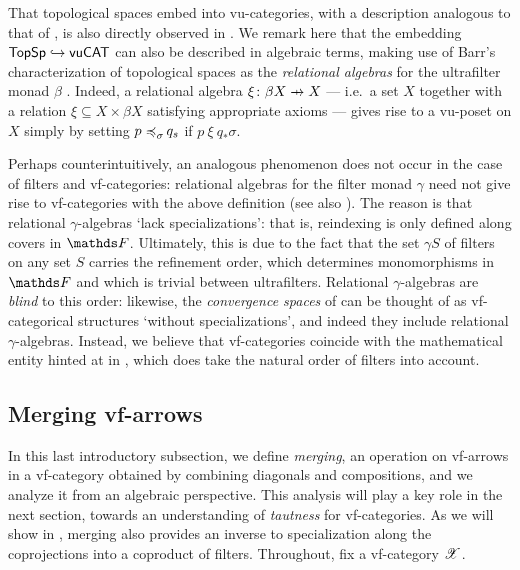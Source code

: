 \begin{rmk}\label{rmk:relational-algebras}
    That topological spaces embed into vu-categories, with a description analogous to that of , is also directly observed in \cite{saadiaExtendingConceptualCompleteness2026, hamadGeneralisedUltracategoriesConceptual2025, vangoolToposesEnoughPoints2026}. We remark here that the embedding $\mathsf{TopSp} \hookrightarrow \mathsf{vuCAT}$ can also be described in algebraic terms, making use of Barr's characterization of topological spaces as the \emph{relational algebras} for the ultrafilter monad $\beta$ \cite{barrRelationalAlgebras1970}. Indeed, a relational algebra $\xi \colon \beta X \pro X $ --- i.e.\ a set $X$ together with a relation $\xi \subseteq X \times \beta X $ satisfying appropriate axioms --- gives rise to a vu-poset on $X$ simply by setting $p \mathrel{\preccurlyeq_{{\sigma}}^{{}}\mkern-2mu} q_s$ if $p \ \xi\ q_* \sigma$.

    Perhaps counterintuitively, an analogous phenomenon does not occur in the case of filters and vf-categories: relational algebras for the filter monad $\gamma$ need not give rise to vf-categories with the above definition (see also \cite{dayFilterMonadsContinuous1975}). The reason is that relational $\gamma$-algebras `lack specializations': that is, reindexing is only defined along covers in $\FF$. Ultimately, this is due to the fact that the set $\gamma S$ of filters on any set $S$ carries the refinement order, which determines monomorphisms in $\FF$ and which is trivial between ultrafilters. Relational $\gamma$-algebras are \emph{blind} to this order: likewise, the \emph{convergence spaces} of \cite[Def.\ 5.28]{aristoteProfunctorialAlgebras2026} can be thought of as vf-categorical structures `without specializations', and indeed they include relational $\gamma$-algebras. Instead, we believe that vf-categories coincide with the mathematical entity hinted at in \cite[Ques.\ 5.31]{aristoteProfunctorialAlgebras2026}, which does take the natural order of filters into account.
\end{rmk}

\subsection{Merging vf-arrows}\label{ssec:merging}In this last introductory subsection, we define \emph{merging}, an operation on vf-arrows in a vf-category obtained by combining diagonals and compositions, and we analyze it from an algebraic perspective. This analysis will play a key role in the next section, towards an understanding of \emph{tautness} for vf-categories. As we will show in , merging also provides an inverse to specialization along the coprojections into a coproduct of filters. Throughout, fix a vf-category $\mathscr{X}$.


